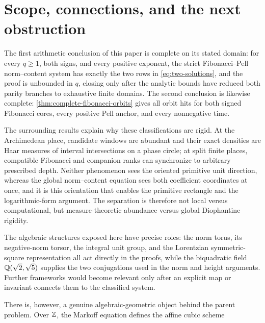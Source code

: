 %
%
\section{Scope, connections, and the next obstruction}
\label{sec:outlook}

The first arithmetic conclusion of this paper is complete on its stated
domain: for every $q\geqslant1$, both signs, and every positive exponent,
the strict Fibonacci--Pell norm--content system has exactly the two rows in
\cref{eq:two-solutions}, and the proof is unbounded in $q$, closing only
after the analytic bounds have reduced both parity branches to exhaustive
finite domains. The second conclusion is likewise complete:
\cref{thm:complete-fibonacci-orbits} gives all orbit hits for both signed
Fibonacci cores, every positive Pell anchor, and every nonnegative time.

The surrounding results explain why these classifications are rigid. At the
Archimedean place, candidate windows are abundant and their exact densities
are Haar measures of interval intersections on a phase circle; at split
finite places, compatible Fibonacci and companion ranks can synchronize to
arbitrary prescribed depth. Neither phenomenon sees the oriented primitive
unit direction, whereas the global norm--content equation sees both
coefficient coordinates at once, and it is this orientation that enables
the primitive rectangle and the logarithmic-form argument. The separation
is therefore not local versus computational, but measure-theoretic
abundance versus global Diophantine rigidity.

The algebraic structures exposed here have precise roles: the norm torus,
its negative-norm torsor, the integral unit group, and the Lorentzian
symmetric-square representation all act directly in the proofs, while the
biquadratic field $\mathbb{Q}(\sqrt2,\sqrt5)$ supplies the two conjugations used in
the norm and height arguments. Further frameworks would become relevant
only after an explicit map or invariant connects them to the classified
system.

There is, however, a genuine algebraic-geometric object behind the parent
problem. Over $\mathbb{Z}$, the Markoff equation defines the affine cubic scheme


